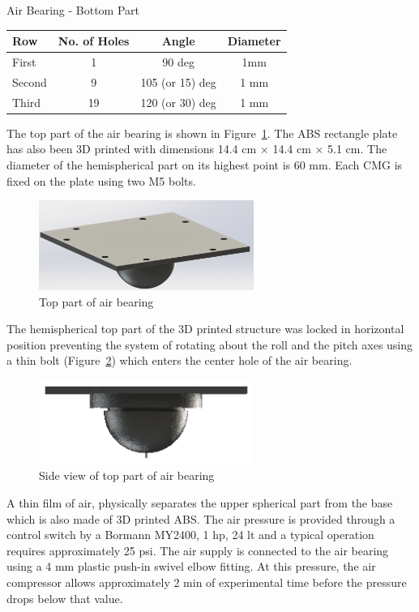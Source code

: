\documentclass[aerospace,article,submit,moreauthors,dvi2pdf]{Definitions/mdpi}
\begin{document}
\begin{specialtable}[H] 
\caption{\label{table:airbear_bot} Air Bearing - Bottom Part}
\begin{tabular}{lccc}
\toprule
\textbf{Row}  & \textbf{No. of Holes}  & \textbf{Angle} & \textbf{Diameter} \\
\midrule
First        & 1   & 90 deg                & 1mm \\
Second   & 9   &105 (or 15) deg   & 1 mm \\
Third      & 19 &120 (or 30) deg   & 1 mm \\
\bottomrule
\end{tabular}
\end{specialtable}

The top part of the air bearing is shown in Figure~\ref{fig:top}. The ABS rectangle plate has also been 3D printed with dimensions 14.4 cm $\times$ 14.4 cm $\times$ 5.1 cm. The diameter of the hemispherical part on its highest point is 60 mm. Each CMG is fixed on the plate using two M5 bolts.

\begin{figure}[H]
\includegraphics[width=7cm]{airtop.eps}
\caption{Top part of air bearing \label{fig:top}}
\end{figure}
The hemispherical top part of the 3D printed structure was locked in horizontal position preventing the system of rotating about the roll and the pitch axes using a thin bolt (Figure~\ref{fig:side}) which enters the center hole of the air bearing.
\begin{figure}[H]
\includegraphics[width=7cm]{airside.eps}
\caption{Side view of top part of air bearing \label{fig:side}}
\end{figure}
A thin film of air, physically separates the upper spherical part from the base which is also made of 3D printed ABS. The air pressure is provided through a control switch by a Bormann MY2400, 1 hp, 24 lt and a typical operation requires approximately 25 psi. The air supply is connected to the air bearing using a 4 mm plastic push-in swivel elbow fitting. At this pressure, the air compressor allows approximately 2 min of experimental time before the pressure drops below that value.
\end{document}
